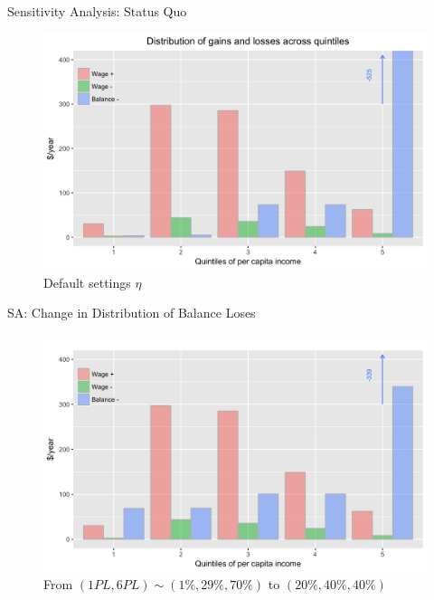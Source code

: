 \documentclass{beamer}
\def\white{\color{white}}
\begin{document}
\begin{frame}[noframenumbering]{Sensitivity Analysis: Status Quo}
\begin{figure}[h!]
\centering
\hspace*{-3em}
\includegraphics[scale = 0.13]{../Images/policy_est}
\caption{Default settings {\white $ \eta $} }
\end{figure}	
\end{frame}

\begin{frame}{SA: Change in Distribution of Balance Loses}
\begin{figure}[h!]
\centering
\hspace*{-3em}
\includegraphics[scale = 0.13]{../Images/policy_est_bl_204040}
\caption{From $(1PL, 6PL) \sim (1\%, 29\%, 70\%)$ to  $(20\%, 40\%, 40\%)$}
\end{figure}	
\end{frame}
\end{document}

